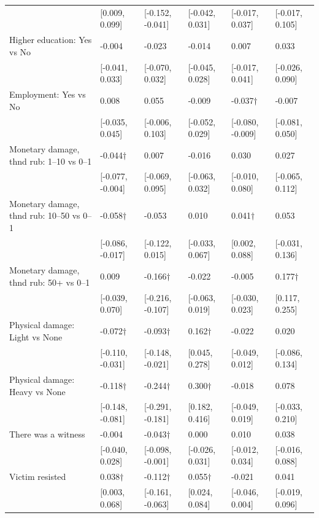 \begin{tabular}[t]{llllll}
 & {}[0.009, 0.099] & {}[-0.152, -0.041] & {}[-0.042, 0.031] & {}[-0.017, 0.037] & {}[-0.017, 0.105]\\
Higher education: Yes vs No & -0.004 & -0.023 & -0.014 & 0.007 & 0.033\\
 & {}[-0.041, 0.033] & {}[-0.070, 0.032] & {}[-0.045, 0.028] & {}[-0.017, 0.041] & {}[-0.026, 0.090]\\
Employment: Yes vs No & 0.008 & 0.055 & -0.009 & -0.037$\dagger$ & -0.007\\
 & {}[-0.035, 0.045] & {}[-0.006, 0.103] & {}[-0.052, 0.029] & {}[-0.080, -0.009] & {}[-0.081, 0.050]\\
Monetary damage, thnd rub:  1–10 vs 0–1 & -0.044$\dagger$ & 0.007 & -0.016 & 0.030 & 0.027\\
 & {}[-0.077, -0.004] & {}[-0.069, 0.095] & {}[-0.063, 0.032] & {}[-0.010, 0.080] & {}[-0.065, 0.112]\\
Monetary damage, thnd rub:  10–50 vs 0–1 & -0.058$\dagger$ & -0.053 & 0.010 & 0.041$\dagger$ & 0.053\\
 & {}[-0.086, -0.017] & {}[-0.122, 0.015] & {}[-0.033, 0.067] & {}[0.002, 0.088] & {}[-0.031, 0.136]\\
Monetary damage, thnd rub:  50+ vs 0–1 & 0.009 & -0.166$\dagger$ & -0.022 & -0.005 & 0.177$\dagger$\\
 & {}[-0.039, 0.070] & {}[-0.216, -0.107] & {}[-0.063, 0.019] & {}[-0.030, 0.023] & {}[0.117, 0.255]\\
Physical damage: Light vs None & -0.072$\dagger$ & -0.093$\dagger$ & 0.162$\dagger$ & -0.022 & 0.020\\
 & {}[-0.110, -0.031] & {}[-0.148, -0.021] & {}[0.045, 0.278] & {}[-0.049, 0.012] & {}[-0.086, 0.134]\\
Physical damage: Heavy vs None & -0.118$\dagger$ & -0.244$\dagger$ & 0.300$\dagger$ & -0.018 & 0.078\\
 & {}[-0.148, -0.081] & {}[-0.291, -0.181] & {}[0.182, 0.416] & {}[-0.049, 0.019] & {}[-0.033, 0.210]\\
There was a witness & -0.004 & -0.043$\dagger$ & 0.000 & 0.010 & 0.038\\
 & {}[-0.040, 0.028] & {}[-0.098, -0.001] & {}[-0.026, 0.031] & {}[-0.012, 0.034] & {}[-0.016, 0.088]\\
Victim resisted & 0.038$\dagger$ & -0.112$\dagger$ & 0.055$\dagger$ & -0.021 & 0.041\\
 & {}[0.003, 0.068] & {}[-0.161, -0.063] & {}[0.024, 0.084] & {}[-0.046, 0.004] & {}[-0.019, 0.096]\\

\end{tabular}
